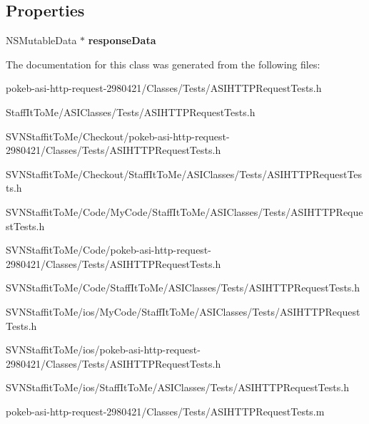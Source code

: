 \subsection*{\-Properties}
\begin{DoxyCompactItemize}
\item 
\hypertarget{interface_a_s_i_h_t_t_p_request_tests_a9b9cab1e2820220bbedfe6de1d379f9d}{
\-N\-S\-Mutable\-Data $\ast$ {\bfseries response\-Data}}
\label{interface_a_s_i_h_t_t_p_request_tests_a9b9cab1e2820220bbedfe6de1d379f9d}

\end{DoxyCompactItemize}


\-The documentation for this class was generated from the following files\-:\begin{DoxyCompactItemize}
\item 
pokeb-\/asi-\/http-\/request-\/2980421/\-Classes/\-Tests/\-A\-S\-I\-H\-T\-T\-P\-Request\-Tests.\-h\item 
\-Staff\-It\-To\-Me/\-A\-S\-I\-Classes/\-Tests/\-A\-S\-I\-H\-T\-T\-P\-Request\-Tests.\-h\item 
\-S\-V\-N\-Staffit\-To\-Me/\-Checkout/pokeb-\/asi-\/http-\/request-\/2980421/\-Classes/\-Tests/\-A\-S\-I\-H\-T\-T\-P\-Request\-Tests.\-h\item 
\-S\-V\-N\-Staffit\-To\-Me/\-Checkout/\-Staff\-It\-To\-Me/\-A\-S\-I\-Classes/\-Tests/\-A\-S\-I\-H\-T\-T\-P\-Request\-Tests.\-h\item 
\-S\-V\-N\-Staffit\-To\-Me/\-Code/\-My\-Code/\-Staff\-It\-To\-Me/\-A\-S\-I\-Classes/\-Tests/\-A\-S\-I\-H\-T\-T\-P\-Request\-Tests.\-h\item 
\-S\-V\-N\-Staffit\-To\-Me/\-Code/pokeb-\/asi-\/http-\/request-\/2980421/\-Classes/\-Tests/\-A\-S\-I\-H\-T\-T\-P\-Request\-Tests.\-h\item 
\-S\-V\-N\-Staffit\-To\-Me/\-Code/\-Staff\-It\-To\-Me/\-A\-S\-I\-Classes/\-Tests/\-A\-S\-I\-H\-T\-T\-P\-Request\-Tests.\-h\item 
\-S\-V\-N\-Staffit\-To\-Me/ios/\-My\-Code/\-Staff\-It\-To\-Me/\-A\-S\-I\-Classes/\-Tests/\-A\-S\-I\-H\-T\-T\-P\-Request\-Tests.\-h\item 
\-S\-V\-N\-Staffit\-To\-Me/ios/pokeb-\/asi-\/http-\/request-\/2980421/\-Classes/\-Tests/\-A\-S\-I\-H\-T\-T\-P\-Request\-Tests.\-h\item 
\-S\-V\-N\-Staffit\-To\-Me/ios/\-Staff\-It\-To\-Me/\-A\-S\-I\-Classes/\-Tests/\-A\-S\-I\-H\-T\-T\-P\-Request\-Tests.\-h\item 
pokeb-\/asi-\/http-\/request-\/2980421/\-Classes/\-Tests/\-A\-S\-I\-H\-T\-T\-P\-Request\-Tests.\-m\item 

\end{DoxyCompactItemize}

